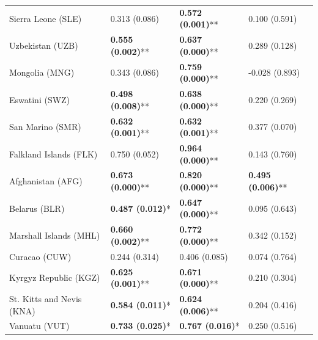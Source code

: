 \begin{longtable}{p{5cm}p{3cm}p{3cm}p{5cm}}
Sierra Leone (SLE) & \textcolor{atlOrange600}{0.313 (0.086)} & \textcolor{atlLime600}{\textbf{0.572 (0.001)}**} & \textcolor{atlOrange600}{0.100 (0.591)} \\
Uzbekistan (UZB) & \textcolor{atlLime600}{\textbf{0.555 (0.002)}**} & \textcolor{atlLime600}{\textbf{0.637 (0.000)}**} & \textcolor{atlOrange600}{0.289 (0.128)} \\
Mongolia (MNG) & \textcolor{atlOrange600}{0.343 (0.086)} & \textcolor{atlLime600}{\textbf{0.759 (0.000)}**} & \textcolor{atlOrange600}{-0.028 (0.893)} \\
Eswatini (SWZ) & \textcolor{atlLime600}{\textbf{0.498 (0.008)}**} & \textcolor{atlLime600}{\textbf{0.638 (0.000)}**} & \textcolor{atlOrange600}{0.220 (0.269)} \\
San Marino (SMR) & \textcolor{atlLime600}{\textbf{0.632 (0.001)}**} & \textcolor{atlLime600}{\textbf{0.632 (0.001)}**} & \textcolor{atlOrange600}{0.377 (0.070)} \\
Falkland Islands (FLK) & \textcolor{atlOrange600}{0.750 (0.052)} & \textcolor{atlLime600}{\textbf{0.964 (0.000)}**} & \textcolor{atlOrange600}{0.143 (0.760)} \\
Afghanistan (AFG) & \textcolor{atlLime600}{\textbf{0.673 (0.000)}**} & \textcolor{atlLime600}{\textbf{0.820 (0.000)}**} & \textcolor{atlLime600}{\textbf{0.495 (0.006)}**} \\
Belarus (BLR) & \textcolor{atlLime600}{\textbf{0.487 (0.012)}*} & \textcolor{atlLime600}{\textbf{0.647 (0.000)}**} & \textcolor{atlOrange600}{0.095 (0.643)} \\
Marshall Islands (MHL) & \textcolor{atlLime600}{\textbf{0.660 (0.002)}**} & \textcolor{atlLime600}{\textbf{0.772 (0.000)}**} & \textcolor{atlOrange600}{0.342 (0.152)} \\
Curacao (CUW) & \textcolor{atlOrange600}{0.244 (0.314)} & \textcolor{atlOrange600}{0.406 (0.085)} & \textcolor{atlOrange600}{0.074 (0.764)} \\
Kyrgyz Republic (KGZ) & \textcolor{atlLime600}{\textbf{0.625 (0.001)}**} & \textcolor{atlLime600}{\textbf{0.671 (0.000)}**} & \textcolor{atlOrange600}{0.210 (0.304)} \\
St. Kitts and Nevis (KNA) & \textcolor{atlLime600}{\textbf{0.584 (0.011)}*} & \textcolor{atlLime600}{\textbf{0.624 (0.006)}**} & \textcolor{atlOrange600}{0.204 (0.416)} \\
Vanuatu (VUT) & \textcolor{atlLime600}{\textbf{0.733 (0.025)}*} & \textcolor{atlLime600}{\textbf{0.767 (0.016)}*} & \textcolor{atlOrange600}{0.250 (0.516)} \\

\end{longtable}
